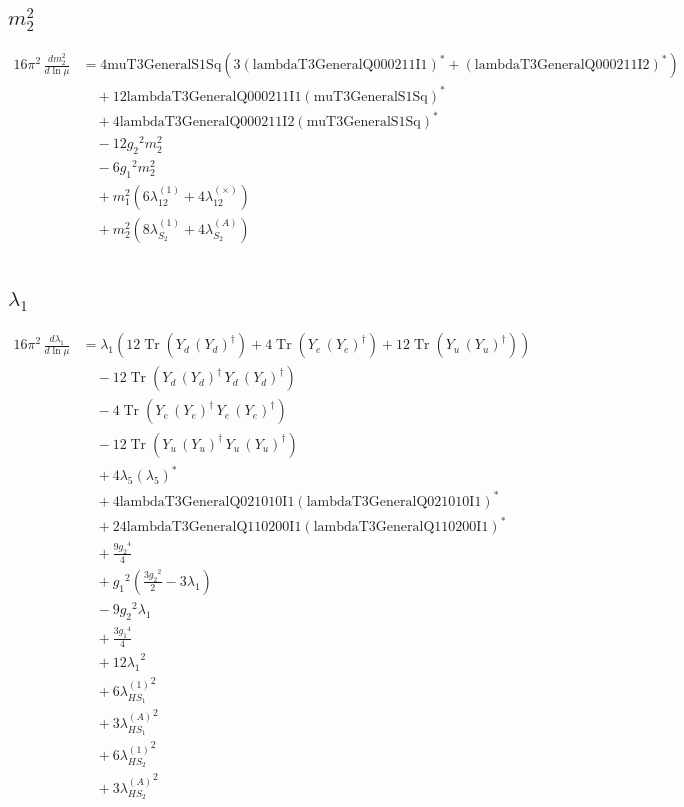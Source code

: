 \documentclass[10pt,a4paper]{article}
\begin{document}
\subsection*{$m_2^2$}
\begin{align*}
16\pi^2\,\frac{d m_2^2}{d\ln\mu} &=4 \text{muT3GeneralS1Sq} (3 \left(\text{lambdaT3GeneralQ000211I1}\right)^{*}+\left(\text{lambdaT3GeneralQ000211I2}\right)^{*}) \\
&\quad +12 \text{lambdaT3GeneralQ000211I1} \left(\text{muT3GeneralS1Sq}\right)^{*} \\
&\quad +4 \text{lambdaT3GeneralQ000211I2} \left(\text{muT3GeneralS1Sq}\right)^{*} \\
&\quad -12 {g_2}^2 {m_2^2} \\
&\quad -6 {g_1}^2 {m_2^2} \\
&\quad +{m_1^2} (6 {\lambda_{12}^{(1)}}+4 {\lambda_{12}^{(\times)}}) \\
&\quad +{m_2^2} (8 {\lambda_{S_2}^{(1)}}+4 {\lambda_{S_2}^{(A)}}) \\
\end{align*}
\subsection*{$\lambda_1$}
\begin{align*}
16\pi^2\,\frac{d \lambda_1}{d\ln\mu} &={\lambda_1} (12 \operatorname{Tr}\!\left({Y_d}\,\left({Y_d}\right)^{\dagger}\right)+4 \operatorname{Tr}\!\left({Y_e}\,\left({Y_e}\right)^{\dagger}\right)+12 \operatorname{Tr}\!\left({Y_u}\,\left({Y_u}\right)^{\dagger}\right)) \\
&\quad -12 \operatorname{Tr}\!\left({Y_d}\,\left({Y_d}\right)^{\dagger}\,{Y_d}\,\left({Y_d}\right)^{\dagger}\right) \\
&\quad -4 \operatorname{Tr}\!\left({Y_e}\,\left({Y_e}\right)^{\dagger}\,{Y_e}\,\left({Y_e}\right)^{\dagger}\right) \\
&\quad -12 \operatorname{Tr}\!\left({Y_u}\,\left({Y_u}\right)^{\dagger}\,{Y_u}\,\left({Y_u}\right)^{\dagger}\right) \\
&\quad +4 {\lambda_5} \left({\lambda_5}\right)^{*} \\
&\quad +4 \text{lambdaT3GeneralQ021010I1} \left(\text{lambdaT3GeneralQ021010I1}\right)^{*} \\
&\quad +24 \text{lambdaT3GeneralQ110200I1} \left(\text{lambdaT3GeneralQ110200I1}\right)^{*} \\
&\quad +\frac{9 {g_2}^4}{4} \\
&\quad +{g_1}^2 \left(\frac{3 {g_2}^2}{2}-3 {\lambda_1}\right) \\
&\quad -9 {g_2}^2 {\lambda_1} \\
&\quad +\frac{3 {g_1}^4}{4} \\
&\quad +12 {\lambda_1}^2 \\
&\quad +6 {\lambda_{HS_1}^{(1)}}^2 \\
&\quad +3 {\lambda_{HS_1}^{(A)}}^2 \\
&\quad +6 {\lambda_{HS_2}^{(1)}}^2 \\
&\quad +3 {\lambda_{HS_2}^{(A)}}^2 \\
\end{align*}
\end{document}
